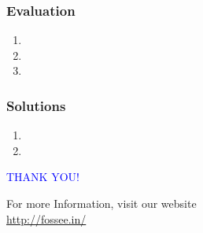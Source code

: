 \documentclass[12pt,compress]{beamer}
\begin{document}
\begin{frame}[fragile]
\frametitle{Evaluation}
\label{sec-9}


\begin{enumerate}
\item 
\item 
\item 
\end{enumerate}
\end{frame}
\begin{frame}
\frametitle{Solutions}
\label{sec-10}


\begin{enumerate}
\item 
\vspace{15pt}
\item 
\end{enumerate}
\end{frame}
\begin{frame}

  \begin{block}{}
  \begin{center}
  \textcolor{blue}{\Large THANK YOU!} 
  \end{center}
  \end{block}
\begin{block}{}
  \begin{center}
    For more Information, visit our website\\
    \url{http://fossee.in/}
  \end{center}  
  \end{block}
\end{frame}
\end{document}
